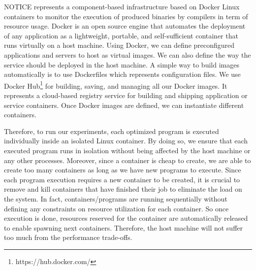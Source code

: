 NOTICE represents a component-based infrastructure based on Docker Linux containers to monitor the execution of produced binaries by compilers in term of resource usage. 
Docker is an open source engine that automates the deployment of any application as a lightweight, portable, and self-sufficient container that runs virtually on a host machine. 
Using Docker, we can define preconfigured applications and servers to host as virtual images. We can also define the way the service should be deployed in the host machine. 
A simple way to build images automatically is to use Dockerfiles which represents configuration files.
We use Docker Hub\footnote{https://hub.docker.com/} for building, saving, and managing all our Docker images. It represents a cloud-based registry service for building and shipping application or service containers.
Once Docker images are defined, we can instantiate different containers.

Therefore, to run our experiments, each optimized program is executed individually inside an isolated Linux container. By doing so, we ensure that each executed program runs in isolation without being affected by the host machine or any other processes. Moreover, since a container is cheap to create, we are able to create too many containers as long as we have new programs to execute. 
Since each program execution requires a new container to be created, it is crucial to remove and kill containers that have finished their job to eliminate the load on the system. In fact, containers/programs are running sequentially without defining any constraints on resource utilization for each container. So once execution is done, resources reserved for the container are automatically released to enable spawning next containers. Therefore, the host machine will not suffer too much from the performance trade-offs.

